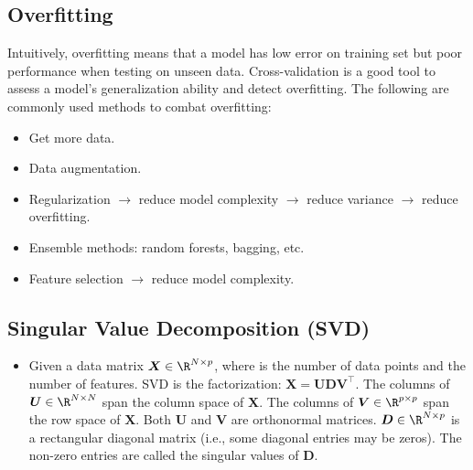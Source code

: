         
    

\subsection{Overfitting}
    Intuitively, overfitting means that a model has low error on training set but poor performance when testing on unseen data.
    Cross-validation is a good tool to assess a model's generalization ability and detect overfitting.
    The following are commonly used methods to combat overfitting:
        \begin{itemize}
            \item Get more data.
            \item Data augmentation.
            \item Regularization $ \rightarrow $ reduce model complexity $ \rightarrow $ reduce variance $ \rightarrow $ reduce overfitting.
            \item Ensemble methods: random forests, bagging, etc.
            \item Feature selection $ \rightarrow $ reduce model complexity.
        \end{itemize}



\subsection{Singular Value Decomposition (SVD)}
    \begin{itemize}
        \item Given a data matrix $\bm{X} \in \R^{\ndata \times \nfeat}$, where \ndata is the number of data points and \nfeat the number of features.
        SVD is the factorization: $\bm{X} = \bm{U} \bm{D} \bm{V}^\top$.
        The columns of $\bm{U} \in \R^{\ndata \times \ndata}$ span the column space of $\bm{X}$.  
        The columns of $\bm{V} \in \R^{\nfeat \times \nfeat}$ span the row space of $\bm{X}$.
        Both $\bm{U}$ and $\bm{V}$ are orthonormal matrices.
        $\bm{D} \in \R^{\ndata \times \nfeat}$ is a rectangular diagonal matrix (i.e., some diagonal entries may be zeros).
        The non-zero entries are called the singular values of $\bm{D}$. 
    \end{itemize}
    
    
